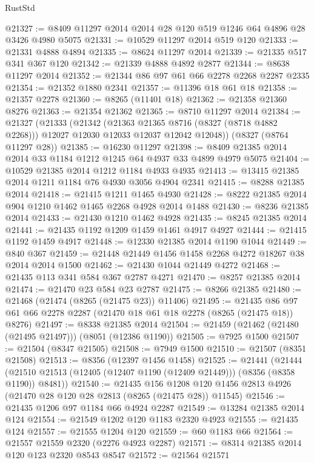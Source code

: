 \begin{lexlean}{RustStd}
\begin{coremodule}
{\begin{coremodule}
{{{{{{{{{{{{{{{{{{{{{{{{{{{{{{{{{{{{{{{{{{{{{{{{{{{{{{@21327 := @8409 @11297 @2014 @2014 @28 @120 @519 @1246 @64 @4896 @28 @3426 @4980 @5075
@21331 := @10529 @11297 @2014 @519 @120
@21333 := @21331 @4888 @4894
@21335 := @8624 @11297 @2014
@21339 := @21335 @517 @341 @367 @120
@21342 := @21339 @4888 @4892 @2877
@21344 := @8638 @11297 @2014
@21352 := @21344 @86 @97 @61 @66 @2278 @2268 @2287 @2335
@21354 := @21352 @1880 @2341
@21357 := @11396 @18 @61 @18
@21358 := @21357 @2278
@21360 := @8265 (@11401 @18)
@21362 := @21358 @21360 @8276
@21363 := @21354 @21362
@21365 := @8710 @11297 @2014
@21384 := @21327
    (@21333
      (@21342
        (@21363 @21365 @8716 (@8327 (@8718 @4882 @2268)))
        @12027
        @12030
        @12033
        @12037
        @12042
        @12048))
    (@8327 (@8764 @11297 @28))
@21385 := @16230 @11297
@21398 := @8409 @21385 @2014 @2014 @33 @1184 @1212 @1245 @64 @4937 @33 @4899 @4979 @5075
@21404 := @10529 @21385 @2014 @1212 @1184 @4933 @4935
@21413 := @13415 @21385 @2014 @1211 @1184 @76 @4930 @3056 @4904 @2341
@21415 := @8288 @21385 @2014
@21418 := @21415 @1211 @1465 @4930
@21428 := @8222 @21385 @2014 @904 @1210 @1462 @1465 @2268 @4928 @2014 @1488
@21430 := @8236 @21385 @2014
@21433 := @21430 @1210 @1462 @4928
@21435 := @8245 @21385 @2014
@21441 := @21435 @1192 @1209 @1459 @1461 @4917 @4927
@21444 := @21415 @1192 @1459 @4917
@21448 := @12330 @21385 @2014 @1190 @1044
@21449 := @840 @367
@21459 := @21448 @21449 @1456 @1458 @2268 @4272 @18267 @38 @2014 @2014 @1500
@21462 := @21430 @1044 @21449 @4272
@21468 := @21435 @113 @341 @584 @367 @2787 @4271
@21470 := @8257 @21385 @2014
@21474 := @21470 @23 @584 @23 @2787
@21475 := @8266 @21385
@21480 := @21468 (@21474 (@8265 (@21475 @23)) @11406)
@21495 := @21435 @86 @97 @61 @66 @2278 @2287 (@21470 @18 @61 @18 @2278 (@8265 (@21475 @18)) @8276)
@21497 := @8338 @21385 @2014
@21504 := @21459 (@21462 (@21480 (@21495 @21497))) (@8051 (@12386 @1190))
@21505 := @7925 @1500
@21507 := @21504 (@8347 @21505)
@21508 := @7949 @1500
@21510 := @21507 (@8351 @21508)
@21513 := @8356 (@12397 @1456 @1458)
@21525 := @21441
    (@21444 (@21510 @21513 (@12405 (@12407 @1190 (@12409 @21449))) (@8356 (@8358 @1190)) @8481))
@21540 := @21435
    @156
    @1208
    @120
    @1456
    @2813
    @4926
    (@21470 @28 @120 @28 @2813 (@8265 (@21475 @28)) @11545)
@21546 := @21435 @1206 @97 @1184 @66 @4924 @2287
@21549 := @13284 @21385 @2014 @124
@21554 := @21549 @1202 @120 @1183 @2320 @4923
@21555 := @21435 @124
@21557 := @21555 @1204 @120
@21559 := @60 @1183 @66
@21564 := @21557 @21559 @2320 (@2276 @4923 @2287)
@21571 := @8314 @21385 @2014 @120 @123 @2320 @8543 @8547
@21572 := @21564 @21571
}}}}}}}}}}}}}}}}}}}}}}}}}}}}}}}}}}}}}}}}}}}}}}}}}}}}}}
\end{coremodule}}
\end{coremodule}
\end{lexlean}
